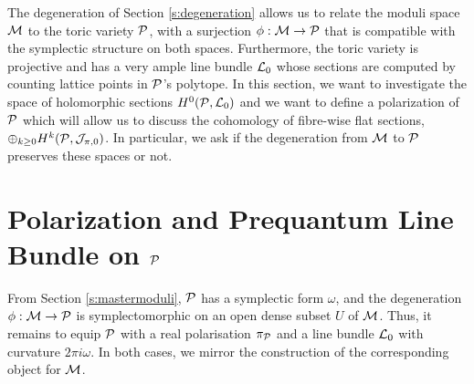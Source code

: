 
	The degeneration of Section \ref{s:degeneration} allows us to relate the moduli space $\mathcal{M}$ to the toric variety $\mathcal{P}$, with a surjection $\phi:\mathcal{M}\to \mathcal{P}$ that is compatible with the symplectic structure on both spaces. Furthermore, the toric variety is projective and has a very ample line bundle $\mathcal{L}_0$ whose sections are computed by counting lattice points in $\mathcal{P}$'s polytope. In this section, we want to investigate the space of holomorphic sections $H^0(\mathcal{P},\mathcal{L}_0)$ and we want to define a polarization of $\mathcal{P}$ which will allow us to discuss the cohomology of fibre-wise flat sections, $\oplus_{k\geq 0}H^k(\mathcal{P}, \mathcal{J}_{\pi,0})$. In particular, we ask if the degeneration from $\mathcal{M}$ to $\mathcal{P}$ preserves these spaces or not.
	 
\section{Polarization and Prequantum Line Bundle on $\mathcal{P}$}
	\label{s:l0-def}
	From Section \ref{s:mastermoduli}, $\mathcal{P}$ has a symplectic form $\omega$, and the degeneration $\phi:\mathcal{M}\to \mathcal{P}$ is symplectomorphic on an open dense subset $U$ of $\mathcal{M}$. Thus, it remains to equip $\mathcal{P}$ with a real polarisation $\pi_{\mathcal{P}}$ and a line bundle $\mathcal{L}_0$ with curvature $2\pi i \omega$. In both cases, we mirror the construction of the corresponding object for $\mathcal{M}$.
	
